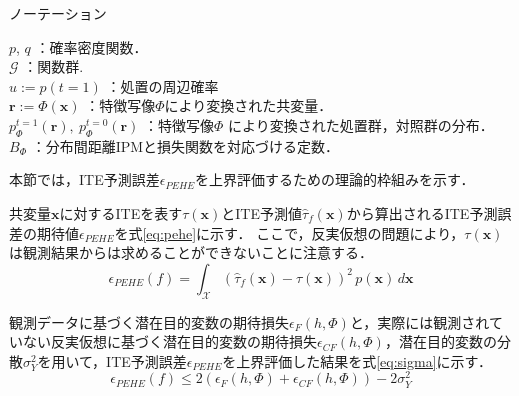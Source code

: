 \documentclass[dvipdfmx]{jreport}
\begin{document}
\begin{itembox}[l]{\large{ノーテーション}}
\begin{tabbing}
        \hspace{15pt} \raisebox{0.5ex}{\tiny $\bullet$} $p$, $q$ \>：確率密度関数． \\[0.5em]
        \hspace{15pt} \raisebox{0.5ex}{\tiny $\bullet$} $\mathcal{G}$ \> ：関数群.\\[0.5em]
        \hspace{15pt} \raisebox{0.5ex}{\tiny $\bullet$} $u := p(t = 1)$ \>：処置の周辺確率\\[0.5em]
        \hspace{15pt} \raisebox{0.5ex}{\tiny $\bullet$} $\boldsymbol{r}:=\Phi(\boldsymbol{x})$ \>：特徴写像$\Phi$により変換された共変量．\\[0.5em]
        \hspace{15pt} \raisebox{0.5ex}{\tiny $\bullet$} $p^{t=1}_\Phi(\boldsymbol{r}),\ p^{t=0}_\Phi(\boldsymbol{r})$ \>：特徴写像$\Phi$ により変換された処置群，対照群の分布．\\[0.5em]        
        \hspace{15pt} \raisebox{0.5ex}{\tiny $\bullet$} $B_\Phi$ \> ：分布間距離IPMと損失関数を対応づける定数．
        
    \end{tabbing}
\end{itembox}

本節では，ITE予測誤差$\epsilon_{PEHE}$を上界評価するための理論的枠組みを示す．

共変量$\boldsymbol{x}$に対するITEを表す$\tau(\boldsymbol{x})$とITE予測値$\hat{\tau}_f(\boldsymbol{x})$から算出されるITE予測誤差の期待値$\epsilon_{PEHE}$を式\eqref{eq:pehe}に示す．
ここで，反実仮想の問題により，$\tau(\boldsymbol{x})$は観測結果からは求めることができないことに注意する．
\begin{equation}
    \epsilon_{PEHE}(f) = \int_{\mathcal{X}} \left( \hat{\tau}_f(\boldsymbol{x}) - \tau(\boldsymbol{x}) \right)^2 \, p(\boldsymbol{x}) \, d\boldsymbol{x} \label{eq:pehe}
\end{equation}

観測データに基づく潜在目的変数の期待損失$\epsilon_F(h, \Phi)$と，実際には観測されていない反実仮想に基づく潜在目的変数の期待損失$\epsilon_{CF}(h, \Phi)$，潜在目的変数の分散$\sigma_Y^2$を用いて，ITE予測誤差$\epsilon_{PEHE}$を上界評価した結果を式\eqref{eq:sigma}に示す．
\begin{equation}
    \epsilon_{PEHE}(f) \leq 2(\epsilon_F(h, \Phi) + \epsilon_{CF}(h, \Phi)) - 2\sigma_Y^2 \label{eq:sigma}
\end{equation}
\end{document}
